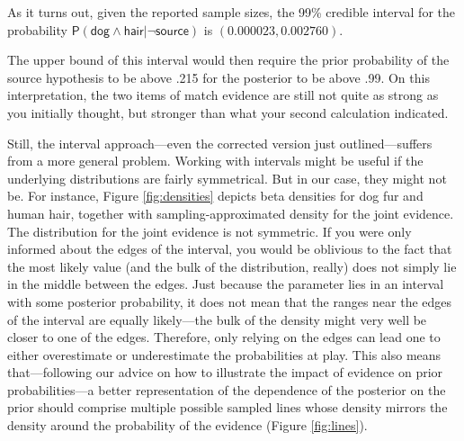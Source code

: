 \documentclass[
  10pt,
  dvipsnames,enabledeprecatedfontcommands]{scrartcl}
\newcommand{\s}[1]{\mbox{$\mathsf{#1}$}}
\begin{document}
As it turns out, given the reported sample sizes, the 99\% credible
interval for the probability
\(\mathsf{P}(\s{dog}\wedge \s{hair} \vert \neg \s{source})\) is
\((0.000023, 0.002760)\). 

The upper bound of this interval would then require the prior
probability of the source hypothesis to be above .215 for the posterior
to be above .99. On this interpretation, the two items of match evidence
are still not quite as strong as you initially thought, but stronger
than what your second calculation indicated.

Still, the interval approach---even the corrected version just
outlined---suffers from a more general problem. Working with intervals
might be useful if the underlying distributions are fairly symmetrical.
But in our case, they might not be. For instance, Figure
\ref{fig:densities} depicts beta densities for dog fur and human hair,
together with sampling-approximated density for the joint evidence. The
distribution for the joint evidence is not symmetric. If you were only
informed about the edges of the interval, you would be oblivious to the
fact that the most likely value (and the bulk of the distribution,
really) does not simply lie in the middle between the edges. Just
because the parameter lies in an interval with some posterior
probability, it does not mean that the ranges near the edges of the
interval are equally likely---the bulk of the density might very well be
closer to one of the edges. Therefore, only relying on the edges can
lead one to either overestimate or underestimate the probabilities at
play. This also means that---following our advice on how to illustrate
the impact of evidence on prior probabilities---a better representation
of the dependence of the posterior on the prior should comprise multiple
possible sampled lines whose density mirrors the density around the
probability of the evidence (Figure \ref{fig:lines}).
\end{document}
